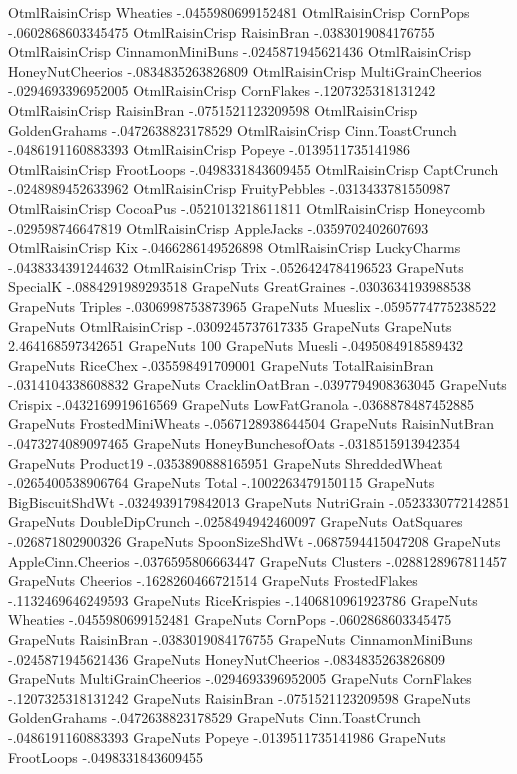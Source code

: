 OtmlRaisinCrisp	Wheaties	-.0455980699152481
OtmlRaisinCrisp	CornPops	-.0602868603345475
OtmlRaisinCrisp	RaisinBran	-.0383019084176755
OtmlRaisinCrisp	CinnamonMiniBuns	-.0245871945621436
OtmlRaisinCrisp	HoneyNutCheerios	-.0834835263826809
OtmlRaisinCrisp	MultiGrainCheerios	-.0294693396952005
OtmlRaisinCrisp	CornFlakes	-.1207325318131242
OtmlRaisinCrisp	RaisinBran	-.0751521123209598
OtmlRaisinCrisp	GoldenGrahams	-.0472638823178529
OtmlRaisinCrisp	Cinn.ToastCrunch	-.0486191160883393
OtmlRaisinCrisp	Popeye	-.0139511735141986
OtmlRaisinCrisp	FrootLoops	-.0498331843609455
OtmlRaisinCrisp	CaptCrunch	-.0248989452633962
OtmlRaisinCrisp	FruityPebbles	-.0313433781550987
OtmlRaisinCrisp	CocoaPus	-.0521013218611811
OtmlRaisinCrisp	Honeycomb	-.029598746647819
OtmlRaisinCrisp	AppleJacks	-.0359702402607693
OtmlRaisinCrisp	Kix	-.0466286149526898
OtmlRaisinCrisp	LuckyCharms	-.0438334391244632
OtmlRaisinCrisp	Trix	-.0526424784196523
GrapeNuts	SpecialK	-.0884291989293518
GrapeNuts	GreatGraines	-.0303634193988538
GrapeNuts	Triples	-.0306998753873965
GrapeNuts	Mueslix	-.0595774775238522
GrapeNuts	OtmlRaisinCrisp	-.0309245737617335
GrapeNuts	GrapeNuts	2.464168597342651
GrapeNuts	100%
GrapeNuts	Muesli	-.0495084918589432
GrapeNuts	RiceChex	-.035598491709001
GrapeNuts	TotalRaisinBran	-.0314104338608832
GrapeNuts	CracklinOatBran	-.0397794908363045
GrapeNuts	Crispix	-.0432169919616569
GrapeNuts	LowFatGranola	-.0368878487452885
GrapeNuts	FrostedMiniWheats	-.0567128938644504
GrapeNuts	RaisinNutBran	-.0473274089097465
GrapeNuts	HoneyBunchesofOats	-.0318515913942354
GrapeNuts	Product19	-.0353890888165951
GrapeNuts	ShreddedWheat	-.0265400538906764
GrapeNuts	Total	-.1002263479150115
GrapeNuts	BigBiscuitShdWt	-.0324939179842013
GrapeNuts	NutriGrain	-.0523330772142851
GrapeNuts	DoubleDipCrunch	-.0258494942460097
GrapeNuts	OatSquares	-.026871802900326
GrapeNuts	SpoonSizeShdWt	-.0687594415047208
GrapeNuts	AppleCinn.Cheerios	-.0376595806663447
GrapeNuts	Clusters	-.0288128967811457
GrapeNuts	Cheerios	-.1628260466721514
GrapeNuts	FrostedFlakes	-.1132469646249593
GrapeNuts	RiceKrispies	-.1406810961923786
GrapeNuts	Wheaties	-.0455980699152481
GrapeNuts	CornPops	-.0602868603345475
GrapeNuts	RaisinBran	-.0383019084176755
GrapeNuts	CinnamonMiniBuns	-.0245871945621436
GrapeNuts	HoneyNutCheerios	-.0834835263826809
GrapeNuts	MultiGrainCheerios	-.0294693396952005
GrapeNuts	CornFlakes	-.1207325318131242
GrapeNuts	RaisinBran	-.0751521123209598
GrapeNuts	GoldenGrahams	-.0472638823178529
GrapeNuts	Cinn.ToastCrunch	-.0486191160883393
GrapeNuts	Popeye	-.0139511735141986
GrapeNuts	FrootLoops	-.0498331843609455
